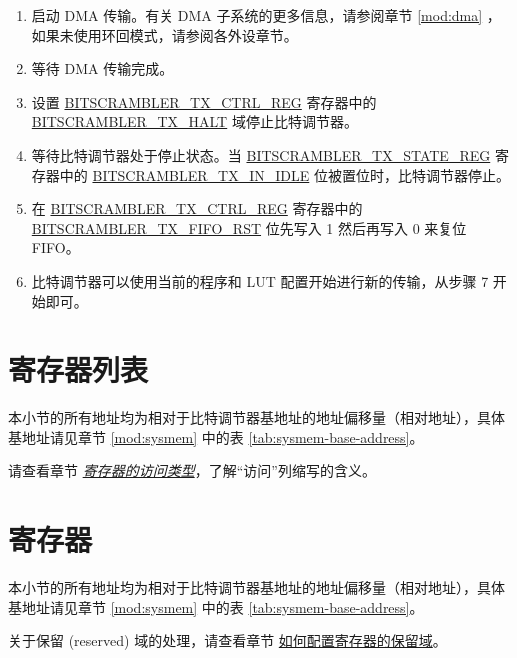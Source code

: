 \documentclass[main\_\_CN.tex]{subfiles}
\begin{document}
\begin{enumerate}
    \item 启动 DMA 传输。有关 DMA 子系统的更多信息，请参阅章节 \ref{mod:dma} \textit{}，如果未使用环回模式，请参阅各外设章节。
    \item 等待 DMA 传输完成。
    \item 设置 \hyperref[regdesc:BITSCRAMBLERTXCTRLREG]{BITSCRAMBLER\_TX\_CTRL\_REG} 寄存器中的 \hyperref[fielddesc:BITSCRAMBLERTXHALT]{BITSCRAMBLER\_TX\_HALT} 域停止比特调节器。
    \item 等待比特调节器处于停止状态。当 \hyperref[regdesc:BITSCRAMBLERTXSTATEREG]{BITSCRAMBLER\_TX\_STATE\_REG} 寄存器中的 \hyperref[fielddesc:BITSCRAMBLERTXINIDLE]{BITSCRAMBLER\_TX\_IN\_IDLE} 位被置位时，比特调节器停止。
    \item 在 \hyperref[regdesc:BITSCRAMBLERTXCTRLREG]{BITSCRAMBLER\_TX\_CTRL\_REG} 寄存器中的 \hyperref[fielddesc:BITSCRAMBLERTXFIFORST]{BITSCRAMBLER\_TX\_FIFO\_RST} 位先写入 1 然后再写入 0 来复位 FIFO。
    \item 比特调节器可以使用当前的程序和 LUT 配置开始进行新的传输，从步骤 7 开始即可。
\end{enumerate}



\newpage
\hypertarget{bitscrm-reg-summ}{}
\section{寄存器列表}
\label{sec:bitscrm-reg-summ}

本小节的所有地址均为相对于比特调节器基地址的地址偏移量（相对地址），具体基地址请见章节 \ref{mod:sysmem} \textit{} 中的表 \ref{tab:sysmem-base-address}。

请查看章节 \hyperref[glossary-access-types]{\textit{寄存器的访问类型}}，了解“访问”列缩写的含义。






\newpage
\section{寄存器}

本小节的所有地址均为相对于比特调节器基地址的地址偏移量（相对地址），具体基地址请见章节 \ref{mod:sysmem} \textit{} 中的表 \ref{tab:sysmem-base-address}。

关于保留 (reserved) 域的处理，请查看章节 \hyperref[programming-reserved-field]{如何配置寄存器的保留域}。


\end{document}
